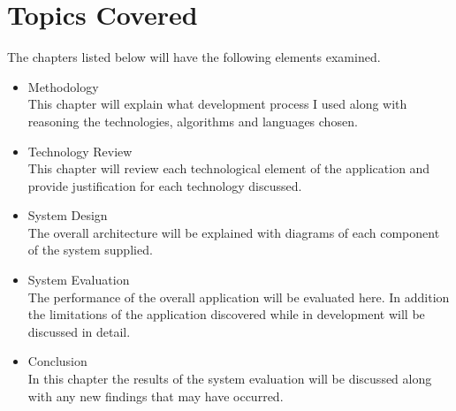 \section{Topics Covered}
The chapters listed below will have the following elements examined.
\begin{itemize}
	\item Methodology\\
	This chapter will explain what development process I used along with reasoning the technologies, algorithms and languages chosen.
	\item Technology Review\\
	This chapter will review each technological element of the application and provide justification for each technology discussed.
	\item System Design\\
	The overall architecture will be explained with diagrams of each component of the system supplied.
	\item System Evaluation\\
	The performance of the overall application will be evaluated here. In addition the limitations of the application discovered while in development will be discussed in detail.
	\item Conclusion\\
	In this chapter the results of the system evaluation will be discussed along with any new findings that may have occurred.
\end{itemize}
